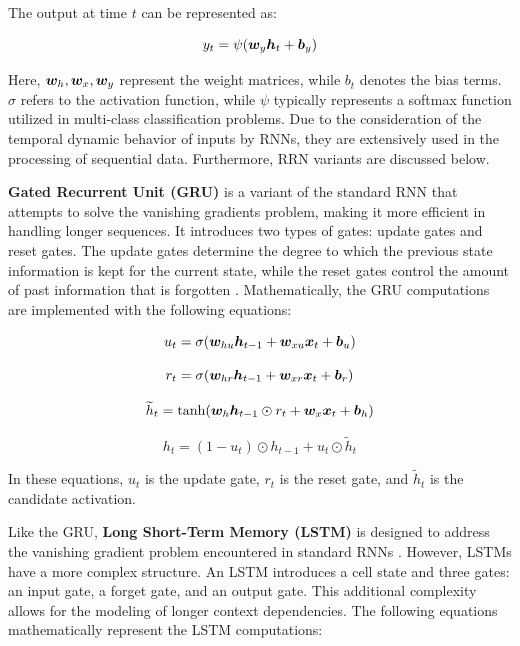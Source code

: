 The output at time $t$ can be represented as:

\begin{equation}
y_t = \psi(\bm {w}_{y}\bm {h}_t + \bm {b}_y)
\end{equation}

Here, $\bm {w}_{h}, \bm {w}_{x}, \bm {w}_{y}$ represent the weight matrices, while $b_t$ denotes the bias terms. $\sigma$ refers to the activation function, while $\psi$ typically represents a softmax function utilized in multi-class classification problems. Due to the consideration of the temporal dynamic behavior of inputs by RNNs, they are extensively used in the processing of sequential data. Furthermore, RRN variants are discussed  below.

\textbf{Gated Recurrent Unit (GRU)} is a variant of the standard RNN that attempts to solve the vanishing gradients problem, making it more efficient in handling longer sequences. It introduces two types of gates: update gates and reset gates. The update gates determine the degree to which the previous state information is kept for the current state, while the reset gates control the amount of past information that is forgotten . Mathematically, the GRU computations are implemented with the following equations:

\begin{equation}
u_t = \sigma(\bm {w}_{hu}\bm {h}_{t-1} + \bm {w}_{xu}\bm {x}_t + \bm {b}_u)
\end{equation}

\begin{equation}
r_t = \sigma(\bm {w}_{hr}\bm {h}_{t-1} + \bm {w}_{xr}\bm {x}_t + \bm {b}_r)
\end{equation}

\begin{equation}
\widetilde{h}_t = \tanh(\bm {w}_{h}\bm {h}_{t-1}\odot r_t + \bm {w}_{x}\bm {x}_t + \bm {b}_h)
\end{equation}

\begin{equation}
h_t = (1 - u_t) \odot h_{t-1} + u_t \odot \widetilde{h}_t
\end{equation}

In these equations, $u_t$ is the update gate, $r_t$ is the reset gate, and $\widetilde{h}_t$ is the candidate activation.

Like the GRU, \textbf{Long Short-Term Memory (LSTM)} is designed to address the vanishing gradient problem encountered in standard RNNs . However, LSTMs have a more complex structure. An LSTM introduces a cell state and three gates: an input gate, a forget gate, and an output gate. This additional complexity allows for the modeling of longer context dependencies. The following equations mathematically represent the LSTM computations:

